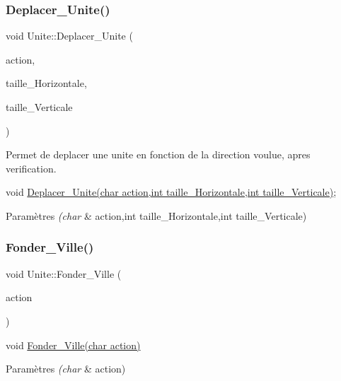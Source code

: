 \subsubsection{\texorpdfstring{Deplacer\+\_\+\+Unite()}{Deplacer\_Unite()}}
{\footnotesize\ttfamily void Unite\+::\+Deplacer\+\_\+\+Unite (\begin{DoxyParamCaption}\item[{char}]{action,  }\item[{int}]{taille\+\_\+\+Horizontale,  }\item[{int}]{taille\+\_\+\+Verticale }\end{DoxyParamCaption})}



Permet de deplacer une unite en fonction de la direction voulue, apres verification. 

void \hyperlink{classUnite_aebf5256ee817c332f1ff9d1874b4b35b}{Deplacer\+\_\+\+Unite(char action,int taille\+\_\+\+Horizontale,int taille\+\_\+\+Verticale)}; 
\begin{DoxyParams}{Paramètres}
{\em (char} & action,int taille\+\_\+\+Horizontale,int taille\+\_\+\+Verticale) \\
\hline
\end{DoxyParams}
\mbox{\label{classUnite_a52c4b262930ba270327ba3d9741d2c08}} 
\subsubsection{\texorpdfstring{Fonder\+\_\+\+Ville()}{Fonder\_Ville()}}
{\footnotesize\ttfamily void Unite\+::\+Fonder\+\_\+\+Ville (\begin{DoxyParamCaption}\item[{char}]{action }\end{DoxyParamCaption})}



void \hyperlink{classUnite_a52c4b262930ba270327ba3d9741d2c08}{Fonder\+\_\+\+Ville(char action)} 


\begin{DoxyParams}{Paramètres}
{\em (char} & action) \\
\hline
\end{DoxyParams}
\mbox{\label{classUnite_a7db327364ab9f7461b180eb1fc868201}} 
